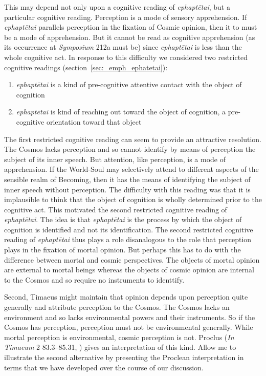 This may depend not only upon a cognitive reading of \emph{ephaptētai}, but a particular cognitive reading. Perception is a mode of sensory apprehension. If \emph{ephaptētai} parallels perception in the fixation of Cosmic opinion, then it to must be a mode of apprehension. But it cannot be read as cognitive apprehension (as its occurrence at \emph{Symposium} 212a must be) since \emph{ephaptētai} is less than the whole cognitive act. In response to this difficulty we considered two restricted cognitive readings (section~\ref{sec:_emph_ephatetai}):
\begin{enumerate}[(1)]
	\item \emph{ephaptētai} is a kind of pre-cognitive attentive contact with the object of cognition
	\item \emph{ephaptētai} is kind of reaching out toward the object of cognition, a pre-cognitive orientation toward that object
\end{enumerate}
The first restricted cognitive reading can seem to provide an attractive resolution. The Cosmos lacks perception and so cannot identify by means of perception the subject of its inner speech. But attention, like perception, is a mode of apprehension. If the World-Soul may selectively attend to different aspects of the sensible realm of Becoming, then it has the means of identifying the subject of inner speech without perception. The difficulty with this reading was that it is implausible to think that the object of cognition is wholly determined prior to the cognitive act. This motivated the second restricted cognitive reading of \emph{ephaptētai}. The idea is that \emph{ephaptētai} is the process by which the object of cognition is identified and not its identification. The second restricted cognitive reading of \emph{ephaptētai} thus plays a role disanalogous to the role that perception plays in the fixation of mortal opinion. But perhaps this has to do with the difference between mortal and cosmic perspectives. The objects of mortal opinion are external to mortal beings whereas the objects of cosmic opinion are internal to the Cosmos and so require no instruments to identtify. 

Second, Timaeus might maintain that opinion depends upon perception quite generally and attribute perception to the Cosmos. The Cosmos lacks an environment and so lacks environmental powers and their instruments. So if the Cosmos has perception, perception must not be environmental generally. While mortal perception is environmental, cosmic perception is not. Proclus (\emph{In Timaeum} 2 83.3–85.31, \citealt{Diehl:1903re}) gives an interpretation of this kind. Allow me to illustrate the second alternative by presenting the Proclean interpretation in terms that we have developed over the course of our discussion.

